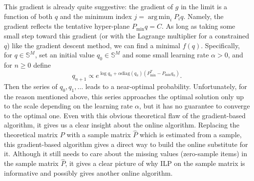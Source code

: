 \documentclass[a4paper,natbib,man]{apa6}
\newcommand{\diag}[1]{\mathrm{diag}\left( #1 \right)}
\newcommand{\Simplex}[1]{\mathbb{S}^{#1}}
\DeclareMathOperator*{\argmin}{arg\,min} %
\begin{document}
This gradient is already quite suggestive: the gradient of $g$ in the limit is a function of both $q$ and the minimum index $j = \argmin_{i}P_{i}q$. Namely, the gradient reflects the tentative hyper-plane $P_{\min}q = C$. As long as taking some small step toward this gradient (or with the Lagrange multiplier for a constrained $q$) like the gradient descent method, we can find a minimal $f(q)$.
Specifically, for $q \in \Simplex{M}$, set an initial value $q_{0} \in \Simplex{M}$ and some small learning rate $\alpha > 0$, 
and for $n \ge 0$ define
\[
 q_{n+1} \propto  e^{ \log q_{n} + \alpha \diag{q_{n}} \left( P_{\min}^{T} - P_{\min}q_{n} \right) }. 
\]
Then the series of $q_{0}, q_{1}, \ldots$ leads to a near-optimal probability. Unfortunately, for the reason mentioned above, this series approaches the optimal solution only up to the scale depending on the learning rate $\alpha$, but it has no guarantee to converge to the optimal one.
Even with this obvious theoretical flaw of the gradient-based algorithm, it gives us a clear insight about the online algorithm. 
Replacing the theoretical matrix $P$ with a sample matrix $\hat{P}$ which is estimated from a sample, this gradient-based algorithm gives a direct way to build the online substitute for it. Although it still needs to care about the missing values (zero-sample items) in the sample matrix $\hat{P}$, it gives a clear picture of why ILP on the sample matrix is informative and possibly gives another online algorithm.

\end{document}
